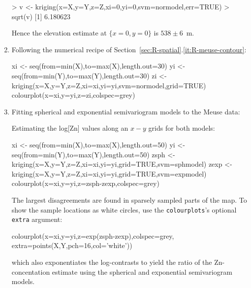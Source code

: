 \begin{enumerate}
\begin{console}
> v <- kriging(x=X,y=Y,z=Z,xi=0,yi=0,svm=normodel,err=TRUE)
> sqrt(v)
[1] 6.180623
\end{console}

Hence the elevation estimate at $\{x=0,y=0\}$ is $538 \pm 6$~m.

\item Following the numerical recipe of
  Section~\ref{sec:R-spatial}.\ref{it:R-meuse-contour}:

\begin{script}[firstnumber=11]
xi <- seq(from=min(X),to=max(X),length.out=30)
yi <- seq(from=min(Y),to=max(Y),length.out=30)
zi <- kriging(x=X,y=Y,z=Z,xi=xi,yi=yi,svm=normodel,grid=TRUE)
colourplot(x=xi,y=yi,z=zi,colspec=grey)
\end{script}

\item Fitting spherical and exponential semivariogram models to the
  Meuse data:


Estimating the log[Zn] values along an $x-y$ grids for both models:

\begin{script}[firstnumber=7]
xi <- seq(from=min(X),to=max(X),length.out=50)
yi <- seq(from=min(Y),to=max(Y),length.out=50)
zsph <- kriging(x=X,y=Y,z=Z,xi=xi,yi=yi,grid=TRUE,svm=sphmodel)
zexp <- kriging(x=X,y=Y,z=Z,xi=xi,yi=yi,grid=TRUE,svm=expmodel)
colourplot(x=xi,y=yi,z=zsph-zexp,colspec=grey)
\end{script}

The largest disagreements are found in sparsely sampled parts of the
map. To show the sample locations as white circles, use the
\texttt{colourplots}'s optional \texttt{extra} argument:

\begin{script}[firstnumber=11]
colourplot(x=xi,y=yi,z=exp(zsph-zexp),colspec=grey,
           extra={points(X,Y,pch=16,col='white')})
\end{script}

\noindent which also exponentiates the log-contrasts to yield the
ratio of the Zn-concentation estimate using the spherical and
exponential semivariogram models.


\end{enumerate}
